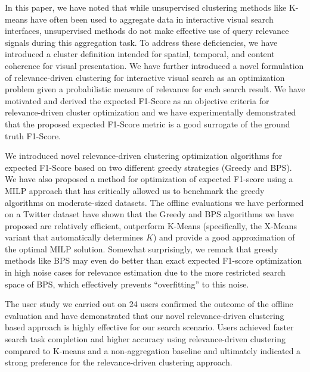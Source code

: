 



In this paper, we have noted that while unsupervised clustering methods like K-means have often been used to aggregate data in interactive visual search interfaces, unsupervised methods do not make effective use of query relevance signals during this aggregation task.  To address these deficiencies, we have introduced a cluster definition intended for spatial, temporal, and content coherence for visual presentation.  We have further introduced a novel formulation of relevance-driven clustering for interactive visual search as an optimization problem given a probabilistic measure of relevance for each search result.  We have motivated and derived the expected F1-Score as an objective criteria for relevance-driven cluster optimization and we have experimentally demonstrated that the proposed expected F1-Score metric is a good surrogate of the ground truth F1-Score.

We introduced novel relevance-driven clustering optimization algorithms for expected F1-Score based on two different greedy strategies (Greedy and BPS).  We have also proposed a method for optimization of expected F1-score using a MILP approach that has critically allowed us to benchmark the greedy algorithms on moderate-sized datasets. The offline evaluations we have performed on a Twitter dataset have shown that the Greedy and BPS algorithms we have proposed are relatively efficient, outperform K-Means (specifically, the X-Means variant that automatically determines $K$) and provide a good approximation of the optimal MILP solution.  Somewhat surprisingly, we remark that greedy methods like BPS may even do better than exact expected F1-score optimization in high noise cases for relevance estimation due to the more restricted search space of BPS, which effectively prevents ``overfitting'' to this noise. 

The user study we carried out on 24 users confirmed the outcome of the offline evaluation and have demonstrated that our novel relevance-driven clustering based approach is highly effective for our search scenario.  Users achieved faster search task completion and higher accuracy using relevance-driven clustering compared to K-means and a non-aggregation baseline and ultimately indicated a strong preference for the relevance-driven clustering approach.

